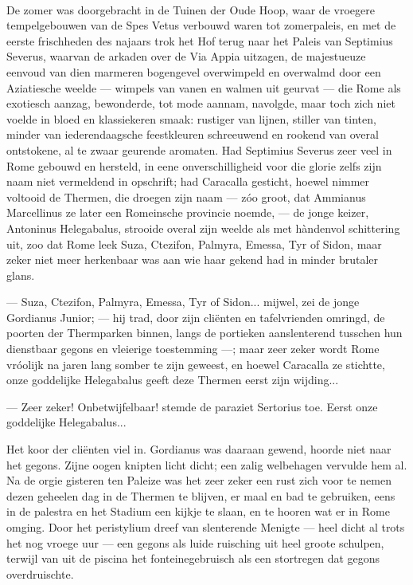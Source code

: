 \documentclass[a4paper, 12pt, oneside, dutch]{article}
\begin{document}
\paragraph{}
De zomer was doorgebracht in de Tuinen der Oude Hoop, waar de vroegere tempelgebouwen van de Spes Vetus verbouwd waren tot zomerpaleis, en met de eerste frischheden des najaars trok het Hof terug naar het Paleis van Septimius Severus, waarvan de arkaden over de Via Appia uitzagen, de majestueuze eenvoud van dien marmeren bogengevel overwimpeld en overwalmd door een Aziatiesche weelde --- wimpels van vanen en walmen uit geurvat --- die Rome als exotiesch aanzag, bewonderde, tot mode aannam, navolgde, maar toch zich niet voelde in bloed en klassiekeren smaak: rustiger van lijnen, stiller van tinten, minder van iederendaagsche feestkleuren schreeuwend en rookend van overal ontstokene, al te zwaar geurende aromaten. Had Septimius Severus zeer veel in Rome gebouwd en hersteld, in eene onverschilligheid voor die glorie zelfs zijn naam niet vermeldend in opschrift; had Caracalla gesticht, hoewel nimmer voltooid de Thermen, die droegen zijn naam --- zóo groot, dat Ammianus Marcellinus ze later een Romeinsche provincie noemde, --- de jonge keizer, Antoninus Helegabalus, strooide overal zijn weelde als met hàndenvol schittering uit, zoo dat Rome leek Suza, Ctezifon, Palmyra, Emessa, Tyr of Sidon, maar zeker niet meer herkenbaar was aan wie haar gekend had in minder brutaler glans.

--- Suza, Ctezifon, Palmyra, Emessa, Tyr of Sidon... mijwel, zei de jonge Gordianus Junior; --- hij trad, door zijn cliënten en tafelvrienden omringd, de poorten der Thermparken binnen, langs de portieken aanslenterend tusschen hun dienstbaar gegons en vleierige toestemming ---; maar zeer zeker wordt Rome vróolijk na jaren lang somber te zijn geweest, en hoewel Caracalla ze stichtte, onze goddelijke Helegabalus geeft deze Thermen eerst zijn wijding...

--- Zeer zeker! Onbetwijfelbaar! stemde de paraziet Sertorius toe. Eerst onze goddelijke Helegabalus...

Het koor der cliënten viel in. Gordianus was daaraan gewend, hoorde niet naar het gegons. Zijne oogen knipten licht dicht; een zalig welbehagen vervulde hem al. Na de orgie gisteren ten Paleize was het zeer zeker een rust zich voor te nemen dezen geheelen dag in de Thermen te blijven, er maal en bad te gebruiken, eens in de palestra en het Stadium een kijkje te slaan, en te hooren wat er in Rome omging. Door het peristylium dreef van slenterende Menigte --- heel dicht al trots het nog vroege uur --- een gegons als luide ruisching uit heel groote schulpen, terwijl van uit de piscina het fonteinegebruisch als een stortregen dat gegons overdruischte.
\end{document}
